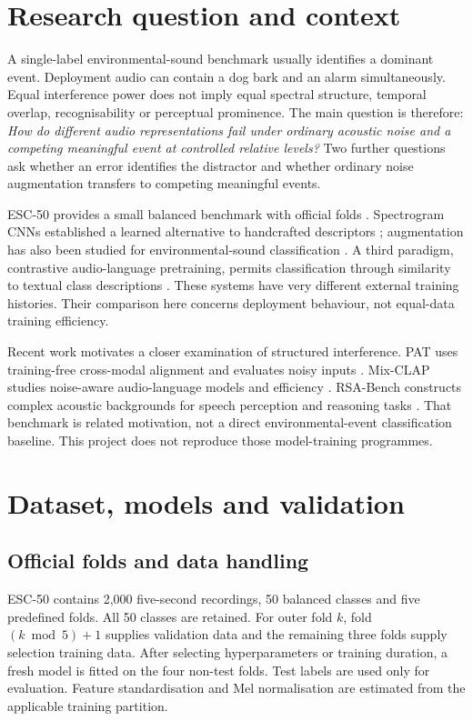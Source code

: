 \documentclass[a4paper,10pt]{article}
\begin{document}
\section{Research question and context}
A single-label environmental-sound benchmark usually identifies a dominant
event. Deployment audio can contain a dog bark and an alarm simultaneously.
Equal interference power does not imply equal spectral structure, temporal
overlap, recognisability or perceptual prominence. The main question is therefore:
\emph{How do different audio representations fail under ordinary acoustic noise
and a competing meaningful event at controlled relative levels?} Two further
questions ask whether an error identifies the distractor and whether ordinary
noise augmentation transfers to competing meaningful events.

ESC-50 provides a small balanced benchmark with official folds
\cite{esc,esc_repo}. Spectrogram CNNs established a learned alternative to
handcrafted descriptors \cite{piczak_cnn}; augmentation has also been studied
for environmental-sound classification \cite{augmentation}. A third paradigm,
contrastive audio-language pretraining, permits classification through similarity
to textual class descriptions \cite{clap}. These systems have very different
external training histories. Their comparison here concerns deployment behaviour,
not equal-data training efficiency.

Recent work motivates a closer examination of structured interference. PAT
uses training-free cross-modal alignment and evaluates noisy inputs
\cite{pat}. Mix-CLAP studies noise-aware audio-language models and efficiency
\cite{mixclap}. RSA-Bench constructs complex acoustic backgrounds for speech
perception and reasoning tasks \cite{rsa}. That benchmark is related motivation,
not a direct environmental-event classification baseline. This project does not
reproduce those model-training programmes.

\section{Dataset, models and validation}
\subsection{Official folds and data handling}
ESC-50 contains 2,000 five-second recordings, 50 balanced classes and five
predefined folds. All 50 classes are retained. For outer fold $k$, fold
$(k\bmod 5)+1$ supplies validation data and the remaining three folds supply
selection training data. After selecting hyperparameters or training duration,
a fresh model is fitted on the four non-test folds. Test labels are used only
for evaluation. Feature standardisation and Mel normalisation are estimated
from the applicable training partition.
\end{document}
